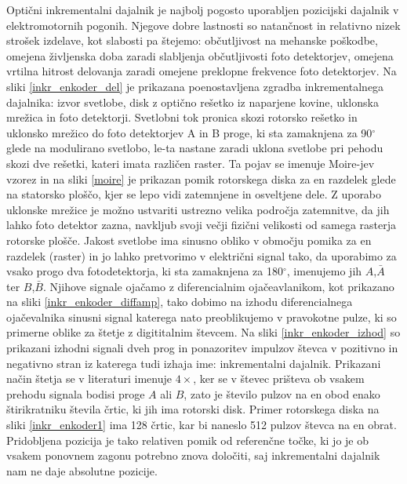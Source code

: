\documentclass[a4paper,twoside,openright,12pt]{book}
\begin{document}
Optični inkrementalni dajalnik je najbolj pogosto uporabljen pozicijski dajalnik v elektromotornih pogonih. Njegove dobre lastnosti so natančnost in relativno nizek strošek izdelave, kot slabosti pa štejemo: občutljivost na mehanske poškodbe, omejena življenska doba zaradi slabljenja občutljivosti foto detektorjev, omejena vrtilna hitrost delovanja zaradi omejene preklopne frekvence foto detektorjev. Na sliki \ref{inkr_enkoder_del} je prikazana poenostavljena zgradba inkrementalnega dajalnika: izvor svetlobe, disk z optično rešetko iz naparjene kovine, uklonska mrežica in foto detektorji. Svetlobni tok pronica skozi rotorsko rešetko in uklonsko mrežico do foto detektorjev A in B proge, ki sta zamaknjena za 90$^\circ$  glede na modulirano svetlobo, le-ta nastane zaradi uklona svetlobe pri pehodu skozi dve rešetki, kateri imata različen raster. Ta pojav se imenuje Moire-jev vzorez in na sliki \ref{moire} \cite{gabrielyan2007basics} je prikazan pomik rotorskega diska za en razdelek glede na statorsko ploščo, kjer se lepo vidi zatemnjene in osveltjene dele. Z uporabo uklonske mrežice je možno ustvariti ustrezno velika področja zatemnitve, da jih lahko foto detektor zazna, navkljub svoji večji fizični velikosti od samega rasterja rotorske plošče. Jakost svetlobe ima sinusno obliko v območju pomika za en razdelek (raster) in jo lahko pretvorimo v električni signal tako, da uporabimo za vsako progo dva fotodetektorja, ki sta zamaknjena za 180$^\circ$, imenujemo jih $A$,$\bar{A}$ ter $B$,$\bar{B}$. Njihove signale ojačamo z diferencialnim ojačeavlanikom, kot prikazano na sliki \ref{inkr_enkoder_diffamp}, tako dobimo na izhodu diferencialnega ojačevalnika sinusni signal katerega nato preoblikujemo v pravokotne pulze, ki so primerne oblike za štetje z digititalnim števcem. Na sliki \ref{inkr_enkoder_izhod} so prikazani izhodni signali dveh prog in ponazoritev impulzov števca v pozitivno in negativno stran iz katerega tudi izhaja ime: inkrementalni dajalnik. Prikazani način štetja se v literaturi imenuje $4\times$, ker se v števec prišteva ob vsakem prehodu signala bodisi proge $A$ ali $B$, zato je število pulzov na en obod enako štirikratniku števila črtic, ki jih ima rotorski disk. Primer rotorskega diska na sliki \ref{inkr_enkoder1} ima 128 črtic, kar bi naneslo 512 pulzov števca na en obrat. Pridobljena pozicija je tako relativen pomik od referenčne točke, ki jo je ob vsakem ponovnem zagonu potrebno znova določiti, saj inkrementalni dajalnik nam ne daje absolutne pozicije. 
\end{document}
